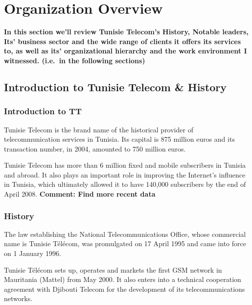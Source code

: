 \chapter{Organization Overview} %
\label{chap:org}
\textbf{In this section we'll review Tunisie Telecom's History, Notable leaders, Its' business sector and the wide range of clients it offers its services to, as well as its' organizational hierarchy and the work environment I witnessed.  (i.e.\ in the following sections)}
\section{Introduction to Tunisie Telecom \& History} %

{}%
\subsection{Introduction to TT}%
Tunisie Telecom is the brand name of the historical provider of telecommunication services in Tunisia. Its capital is 875 million euros and its transaction number, in 2004, amounted to 750 million euros.

Tunisie Telecom has more than 6 million fixed and mobile subscribers in Tunisia and abroad. It also plays an important role in improving the Internet's influence in Tunisia, which ultimately allowed it to have 140,000 subscribers by the end of April 2008.
\textbf{Comment: Find more recent data}

\subsection{History}
The law establishing the National Telecommunications Office, whose commercial name is Tunisie Télécom, was promulgated on 17 April 1995 and came into force on 1 January 1996.

Tunisie Télécom sets up, operates and markets the first GSM network in Mauritania (Mattel) from May 2000. It also enters into a technical cooperation agreement with Djibouti Telecom for the development of its telecommunications networks.

